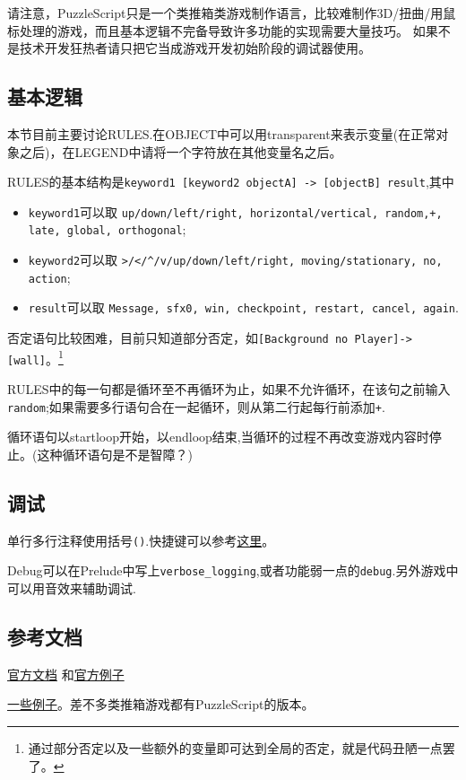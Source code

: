 \documentclass[11pt]{amsart}
\begin{document}
请注意，PuzzleScript只是一个类推箱类游戏制作语言，比较难制作3D/扭曲/用鼠标处理的游戏，而且基本逻辑不完备导致许多功能的实现需要大量技巧。 如果不是技术开发狂热者请只把它当成游戏开发初始阶段的调试器使用。
\subsection{基本逻辑}
本节目前主要讨论RULES.在OBJECT中可以用transparent来表示变量(在正常对象之后)，在LEGEND中请将一个字符放在其他变量名之后。

RULES的基本结构是\lstinline|keyword1 [keyword2 objectA] -> [objectB] result|,其中
\begin{itemize}
\item \lstinline|keyword1|可以取 \lstinline|up/down/left/right, horizontal/vertical, random,+, late, global, orthogonal|;
\item \lstinline|keyword2|可以取 \lstinline|>/</^/v/up/down/left/right, moving/stationary, no, action|;
\item \lstinline|result|可以取 \lstinline|Message, sfx0, win, checkpoint, restart, cancel, again|.
\end{itemize}
   

否定语句比较困难，目前只知道部分否定，如\lstinline|[Background no Player]->[wall]|。\footnote{通过部分否定以及一些额外的变量即可达到全局的否定，就是代码丑陋一点罢了。}

RULES中的每一句都是循环至不再循环为止，如果不允许循环，在该句之前输入\lstinline|random|;如果需要多行语句合在一起循环，则从第二行起每行前添加\lstinline|+|.

循环语句以startloop开始，以endloop结束,当循环的过程不再改变游戏内容时停止。(这种循环语句是不是智障？)
\subsection{调试}
单行多行注释使用括号\lstinline|()|.快捷键可以参考\href{https://pancelor.com/PuzzleScript/Documentation/keyboard_shortcuts.html}{这里}。

Debug可以在Prelude中写上\lstinline|verbose_logging|,或者功能弱一点的\lstinline|debug|.另外游戏中可以用音效来辅助调试.
\subsection{参考文档}
\href{https://www.puzzlescript.net/Documentation/documentation.html}{官方文档}
和\href{https://www.puzzlescript.net/Gallery/index.html}{官方例子}

\href{https://erich-friedman.github.io/published/interactive.html}{一些例子}。差不多类推箱游戏都有PuzzleScript的版本。
\end{document}
